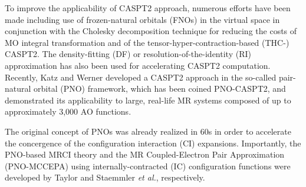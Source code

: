 \documentclass[aip,jcp,amsmath]{revtex4-1}
\begin{document}
%
To improve the applicability of CASPT2 approach, numerous efforts have been made including use of frozen-natural orbitals (FNOs)\cite{doi:10.1063/1.3157463,doi:10.1021/acs.jctc.5b00479} in the virtual space in conjunction with the Cholesky decomposition technique for reducing the costs of MO integral transformation\cite{doi:10.1063/1.2953696,doi:10.1021/ct9000284,doi:10.1021/ct700263h,doi:10.1021/ct900612k} and of the tensor-hyper-contraction-based (THC-) CASPT2.\cite{doi:10.1063/1.5037283}
%
The density-fitting (DF) or resolution-of-the-identity (RI) approximation has also been used for accelerating CASPT2 computation.\cite{ShioWerner2013}
%
Recently, Katz and Werner developed a CASPT2 approach in the so-called pair-natural orbital (PNO) framework, which has been coined PNO-CASPT2, and demonstrated its applicability to large, real-life MR systems composed of up to approximately 3,000 AO functions.\cite{:/content/aip/journal/jcp/145/12/10.1063/1.4963019,doi:10.1063/1.5097644}

%
The original concept of PNOs was already realized in 60s in order to accelerate the concergence of the configuration interaction (CI) expansions.\cite{:/content/aip/journal/jcp/40/12/10.1063/1.1725065,:/content/aip/journal/jcp/48/4/10.1063/1.1668917,:/content/aip/journal/jcp/42/3/10.1063/1.1696050,:/content/aip/journal/jcp/45/5/10.1063/1.1727841,meyer1971ionization,:/content/aip/journal/jcp/58/3/10.1063/1.1679283,meyer1971ionization,Ahlrichs1968_2}
%
Importantly, the PNO-based MRCI theory and the MR Coupled-Electron Pair Approximation (PNO-MCCEPA) using internally-contracted (IC) configuration functions were developed by Taylor\cite{:/content/aip/journal/jcp/74/2/10.1063/1.441186} and Staemmler {\it et al.},\cite{Staemmler1993} respectively.
\end{document}
